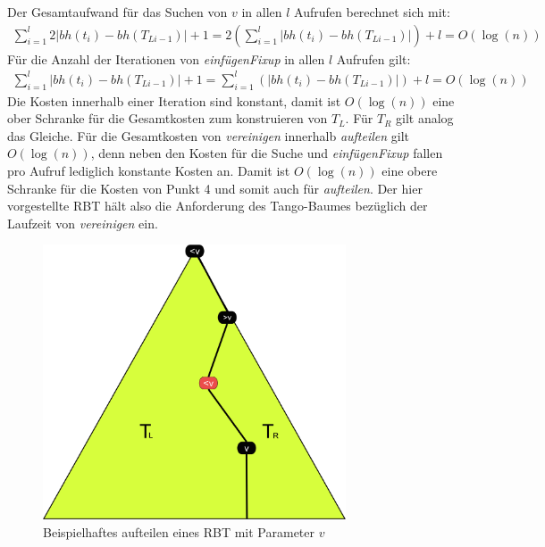 \documentclass[a4paper,12pt]{article}
\begin{document}
\noindent Der Gesamtaufwand für das Suchen von $v$ in allen $l$ Aufrufen berechnet sich mit: 
\begin{align*}
\sum_{i = 1}^{l}  2 \vert\mathit{bh}(t_{i}) -\mathit{bh}(T_{Li-1}) \vert + 1 =
2 \left( \sum_{i = 1}^{l}   \vert\mathit{bh}(t_{i}) -\mathit{bh}(T_{Li-1}) \vert \right)+ l
= O \left(\log \left(n \right) \right)
\end{align*}
\noindent Für die Anzahl der Iterationen von \textit{einfügenFixup} in allen $l$ Aufrufen gilt: 
\begin{align*}
\sum_{i = 1}^{l}   \vert\mathit{bh}(t_{i}) -\mathit{bh}(T_{Li-1}) \vert +1 =
\sum_{i = 1}^{l}  \left( \vert\mathit{bh}(t_{i}) -\mathit{bh}(T_{Li-1}) \vert \right) + l 
= O \left(\log \left(n \right) \right)
\end{align*}
Die Kosten innerhalb einer Iteration sind konstant, damit ist  $O \left(\log \left(n \right) \right)$ eine ober Schranke für die Gesamtkosten zum konstruieren von $T_L$. Für $T_R$ gilt analog das Gleiche. Für die Gesamtkosten von \textit{vereinigen} innerhalb \textit{aufteilen} gilt $O \left(\log \left(n \right) \right)$, denn neben den Kosten für die Suche und \textit{einfügenFixup} fallen pro Aufruf lediglich konstante Kosten an. Damit ist $O \left(\log \left(n \right) \right)$ eine obere Schranke für die Kosten von Punkt 4 und somit auch für \textit{aufteilen}. Der hier vorgestellte RBT hält also die Anforderung des Tango-Baumes bezüglich der Laufzeit von \textit{vereinigen} ein.







\begin{figure}[h]
	\centering
	\includegraphics[width=0.8\textwidth]{"Medien/RotSchwarzBaum/aufteilen"}
	\caption{Beispielhaftes aufteilen eines RBT mit Parameter $v$ }
	\label{fig:aufteilen}
\end{figure}
\newpage


\end{document}
